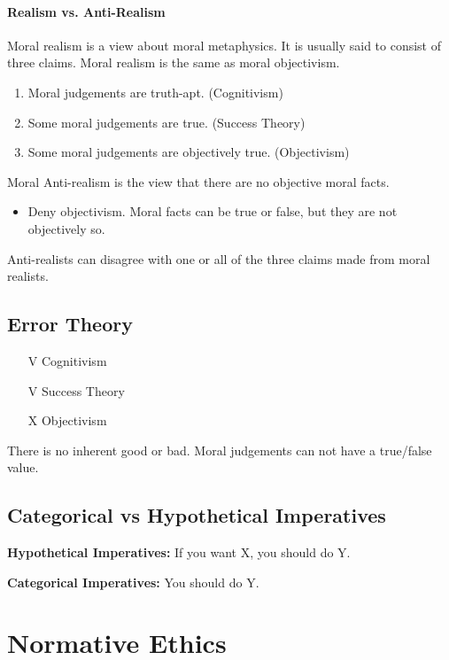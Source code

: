 \documentclass[12pt]{article}
\begin{document}
\paragraph{Realism vs. Anti-Realism}

Moral realism is a view about moral metaphysics. It is usually said to consist of three claims. Moral realism is the same as moral objectivism.
\begin{enumerate}
    \item Moral judgements are truth-apt. (Cognitivism)
    \item Some moral judgements are true. (Success Theory)
    \item Some moral judgements are objectively true. (Objectivism)
\end{enumerate}

Moral Anti-realism is the view that there are no objective moral facts.
\begin{itemize}
    \item Deny objectivism. Moral facts can be true or false, but they are not objectively so.
\end{itemize}

Anti-realists can disagree with one or all of the three claims made from moral realists.

\subsection{Error Theory}

\begin{itemize}
    \item [V] Cognitivism
    \item [V] Success Theory
    \item [X] Objectivism
\end{itemize}

There is no inherent good or bad. Moral judgements can not have a true/false value.

\subsection{Categorical vs Hypothetical Imperatives}

\noindent

\textbf{Hypothetical Imperatives:} If you want X, you should do Y.

\textbf{Categorical Imperatives:} You should do Y.

\section{Normative Ethics}
\end{document}
